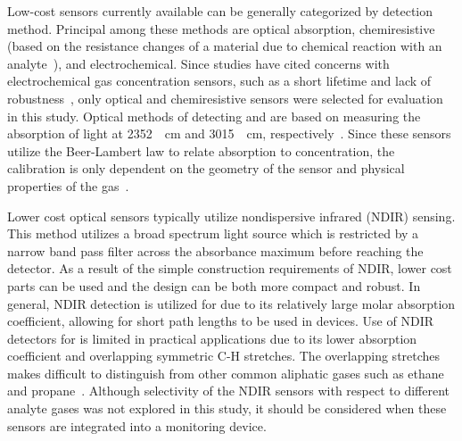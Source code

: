 \documentclass[sensors,article,submit,moreauthors,pdftex]{Definitions/mdpi}
\begin{document}
		Low-cost sensors currently available can be generally categorized by detection method.
		Principal among these methods are optical absorption, chemiresistive (based on the resistance changes of a material due to chemical reaction with an analyte~\cite{wetchakun_semiconducting_2011}), and electrochemical.
		Since studies have cited concerns with electrochemical gas concentration sensors, such as a short lifetime and lack of robustness~\cite{neri_first_2015}, only optical and chemiresistive sensors were selected for evaluation in this study.
		Optical methods of detecting  and  are based on measuring the absorption of light at \SI{2352}{\per\centi\meter} and \SI{3015}{\per\centi\meter}, respectively~\cite{frodl_high-precision_2006,zhu_one_2012}.
		Since these sensors utilize the Beer-Lambert law to relate absorption to concentration, the calibration is only dependent on the geometry of the sensor and physical properties of the gas~\cite{bacsik_ftir_2004}.
		
		Lower cost optical sensors typically utilize nondispersive infrared (NDIR) sensing.
		This method utilizes a broad spectrum light source which is restricted by a narrow band pass filter across the absorbance maximum before reaching the detector.
		As a result of the simple construction requirements of NDIR, lower cost parts can be used and the design can be both more compact and robust.
		In general, NDIR detection is utilized for  due to its relatively large molar absorption coefficient, allowing for short path lengths to be used in devices.
		Use of NDIR detectors for  is limited in practical applications due to its lower absorption coefficient and overlapping symmetric C-H stretches.
		The overlapping stretches makes  difficult to distinguish from other common aliphatic gases such as ethane and propane~\cite{coblentz_society_inc._evaluated_????}.
		Although selectivity of the NDIR sensors with respect to different analyte gases was not explored in this study, it should be considered when these sensors are integrated into a monitoring device. 
		
\end{document}

